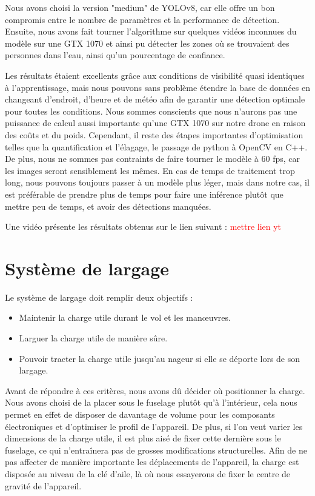 \documentclass[a4paper,12pt,french]{report}
\begin{document}
Nous avons choisi la version "medium" de YOLOv8, car elle offre un bon compromis entre le nombre de paramètres et la performance de détection. Ensuite, nous avons fait tourner l'algorithme sur quelques vidéos inconnues du modèle sur une GTX 1070 et ainsi pu détecter les zones où se trouvaient des personnes dans l'eau, ainsi qu'un pourcentage de confiance.\newline

Les résultats étaient excellents grâce aux conditions de visibilité quasi identiques à l'apprentissage, mais nous pouvons sans problème étendre la base de données en changeant d'endroit, d'heure et de météo afin de garantir une détection optimale pour toutes les conditions. Nous sommes conscients que nous n'aurons pas une puissance de calcul aussi importante qu'une GTX 1070 sur notre drone en raison des coûts et du poids. Cependant, il reste des étapes importantes d'optimisation telles que la quantification et l'élagage, le passage de python à OpenCV en C++. De plus, nous ne sommes pas contraints de faire tourner le modèle à 60 fps, car les images seront sensiblement les mêmes. En cas de temps de traitement trop long, nous pouvons toujours passer à un modèle plus léger, mais dans notre cas, il est préférable de prendre plus de temps pour faire une inférence plutôt que mettre peu de temps, et avoir des détections manquées.\newline

Une vidéo présente les résultats obtenus sur le lien suivant :
\textcolor{red}{mettre lien yt}

\section{Système de largage}
\label{larg}
Le système de largage doit remplir deux objectifs :

\begin{itemize}
    \item Maintenir la charge utile durant le vol et les manœuvres.
    \item Larguer la charge utile de manière sûre.
    \item Pouvoir tracter la charge utile jusqu’au nageur si elle se déporte lors de son largage.\newline
\end{itemize}

Avant de répondre à ces critères, nous avons dû décider où positionner la charge. Nous avons choisi de la placer sous le fuselage plutôt qu’à l’intérieur, cela nous permet en effet de disposer de davantage de volume pour les composants électroniques et d’optimiser le profil de l’appareil. De plus, si l’on veut varier les dimensions de la charge utile, il est plus aisé de fixer cette dernière sous le fuselage, ce qui n'entraînera pas de grosses modifications structurelles. Afin de ne pas affecter de manière importante les déplacements de l’appareil, la charge est disposée au niveau de la clé d’aile, là où nous essayerons de fixer le centre de gravité de l’appareil.\newline
\end{document}
